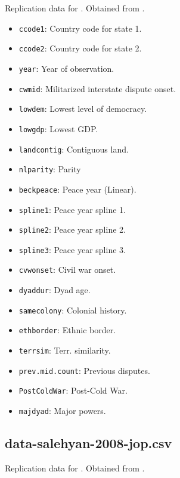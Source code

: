 \documentclass[12pt]{article}
\begin{document}
Replication data for \citet{Park:2014gg}.
Obtained from \citet{park2014data}.

\begin{itemize}
  \item \texttt{ccode1}: Country code for state 1.
  \item \texttt{ccode2}: Country code for state 2. 
  \item \texttt{year}: Year of observation.
  \item \texttt{cwmid}: Militarized interstate dispute onset.
  \item \texttt{lowdem}: Lowest level of democracy.
  \item \texttt{lowgdp}: Lowest GDP. 
  \item \texttt{landcontig}: Contiguous land.
  \item \texttt{nlparity}: Parity
  \item \texttt{beckpeace}: Peace year (Linear).
  \item \texttt{spline1}: Peace year spline 1.
  \item \texttt{spline2}: Peace year spline 2.
  \item \texttt{spline3}: Peace year spline 3.
  \item \texttt{cvwonset}: Civil war onset.
  \item \texttt{dyaddur}: Dyad age.
  \item \texttt{samecolony}: Colonial history.
  \item \texttt{ethborder}: Ethnic border.
  \item \texttt{terrsim}: Terr. similarity.
  \item \texttt{prev.mid.count}: Previous disputes.
  \item \texttt{PostColdWar}: Post-Cold War.
  \item \texttt{majdyad}: Major powers.
\end{itemize}


\subsection{data-salehyan-2008-jop.csv}

Replication data for \citet{salehyan2008}.
Obtained from \citet{salehyan2008jopdata}.
\end{document}
